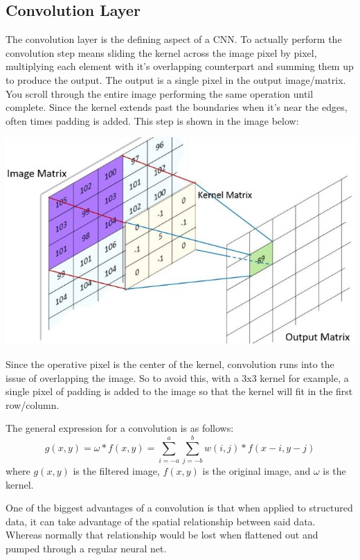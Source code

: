\documentclass{article}
\begin{document}
    \subsection{Convolution Layer}
        The convolution layer is the defining aspect of a CNN. To actually perform the convolution step means sliding the kernel across the image pixel by pixel, multiplying each element with it's overlapping counterpart and summing them up to produce the output. The output is a single pixel in the output image/matrix. You scroll through the entire image performing the same operation until complete. Since the kernel extends past the boundaries when it's near the edges, often times padding is added. This step is shown in the image below:
        
        \begin{center}
            \includegraphics[scale=0.6]{images/kernel.jpg}
        \end{center}
        
        Since the operative pixel is the center of the kernel, convolution runs into the issue of overlapping the image. So to avoid this, with a 3x3 kernel for example, a single pixel of padding is added to the image so that the kernel will fit in the first row/column.

        The general expression for a convolution is as follows:
        \[ g(x, y) = \omega \ast f(x, y) = \sum_{i=-a}^{a} \sum_{j=-b}^{b} w(i, j) * f(x - i, y - j) \]
        where $g(x, y)$ is the filtered image, $f(x, y)$ is the original image, and $\omega$ is the kernel.

        One of the biggest advantages of a convolution is that when applied to structured data, it can take advantage of the spatial relationship between said data. Whereas normally that relationship would be lost when flattened out and pumped through a regular neural net.
\end{document}
